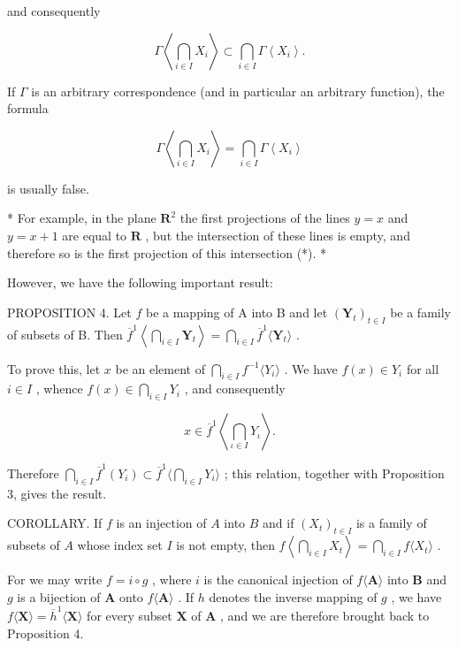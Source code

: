 and consequently

\[
\Gamma \left\langle \bigcap_ {i \in I} X _ {i} \right\rangle \subset \bigcap_ {i \in I} \Gamma \left\langle X _ {i} \right\rangle .
\]

If \(\Gamma\) is an arbitrary correspondence (and in particular an arbitrary function), the formula

\[
\Gamma \left\langle \bigcap_ {i \in I} X _ {i} \right\rangle = \bigcap_ {i \in I} \Gamma \left\langle X _ {i} \right\rangle
\]

is usually false.

* For example, in the plane \(\mathbf{R}^2\) the first projections of the lines \(y = x\) and \(y = x + 1\) are equal to \(\mathbf{R}\) , but the intersection of these lines is empty, and therefore so is the first projection of this intersection (*). *

However, we have the following important result:

PROPOSITION 4. Let \(f\) be a mapping of A into B and let \((\mathbf{Y}_t)_{t \in I}\) be a family of subsets of B. Then \(\overline{f}^1 \left\langle \bigcap_{i \in I} \mathbf{Y}_t \right\rangle = \bigcap_{i \in I} \overline{f}^1 \langle \mathbf{Y}_t \rangle\) .

To prove this, let \(x\) be an element of \(\bigcap_{i \in I} f^{-1} \langle Y_i \rangle\) . We have \(f(x) \in Y_i\) for all \(i \in I\) , whence \(f(x) \in \bigcap_{i \in I} Y_i\) , and consequently

\[
x \in \overline {{f}} ^ {1} \left\langle \bigcap_ {\iota \in I} Y _ {\iota} \right\rangle .
\]

Therefore \(\bigcap_{i\in I}\overline{f}^{1}(Y_{i})\subset\overline{f}^{1}\Big\langle\bigcap_{i\in I}Y_{i}\Big\rangle\) ; this relation, together with Proposition 3, gives the result.

COROLLARY. If \(f\) is an injection of \(A\) into \(B\) and if \((X_{t})_{t \in I}\) is a family of subsets of \(A\) whose index set \(I\) is not empty, then \(f\left\langle \bigcap_{i \in I} X_{t} \right\rangle = \bigcap_{i \in I} f\langle X_{t} \rangle\) .

For we may write \(f = i \circ g\) , where \(i\) is the canonical injection of \(f\langle \mathbf{A} \rangle\) into \(\mathbf{B}\) and \(g\) is a bijection of \(\mathbf{A}\) onto \(f\langle \mathbf{A} \rangle\) . If \(h\) denotes the inverse mapping of \(g\) , we have \(f\langle \mathbf{X} \rangle = \overline{h}^1\langle \mathbf{X} \rangle\) for every subset \(\mathbf{X}\) of \(\mathbf{A}\) , and we are therefore brought back to Proposition 4.

